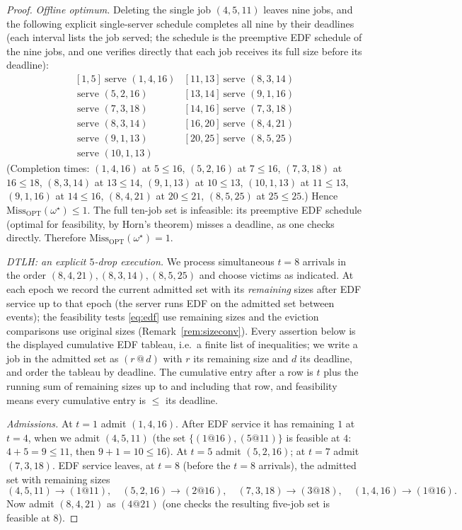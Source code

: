 \documentclass{amsart}
\theoremstyle{definition}
\begin{document}
\begin{proof}
\emph{Offline optimum.} Deleting the single job $(4,5,11)$ leaves nine jobs, and
the following explicit single-server schedule completes all nine by their
deadlines (each interval lists the job served; the schedule is the preemptive EDF
schedule of the nine jobs, and one verifies directly that each job receives its
full size before its deadline):
\[
\begin{array}{ll}
[1,5]\ \text{serve }(1,4,16) & [11,13]\ \text{serve }(8,3,14)\\
[5,7]\ \text{serve }(5,2,16) & [13,14]\ \text{serve }(9,1,16)\\
[7,8]\ \text{serve }(7,3,18) & [14,16]\ \text{serve }(7,3,18)\\
[8,9]\ \text{serve }(8,3,14) & [16,20]\ \text{serve }(8,4,21)\\
[9,10]\ \text{serve }(9,1,13)& [20,25]\ \text{serve }(8,5,25)\\
[10,11]\ \text{serve }(10,1,13)&
\end{array}
\]
(Completion times: $(1,4,16)$ at $5\le16$, $(5,2,16)$ at $7\le16$, $(7,3,18)$ at
$16\le18$, $(8,3,14)$ at $13\le14$, $(9,1,13)$ at $10\le13$, $(10,1,13)$ at
$11\le13$, $(9,1,16)$ at $14\le16$, $(8,4,21)$ at $20\le21$, $(8,5,25)$ at
$25\le25$.) Hence $\mathrm{Miss}_{\mathrm{OPT}}(\omega^\star)\le1$. The full
ten-job set is infeasible: its preemptive EDF schedule (optimal for feasibility,
by Horn's theorem) misses a deadline, as one checks directly. Therefore
$\mathrm{Miss}_{\mathrm{OPT}}(\omega^\star)=1$.

\emph{DTLH: an explicit $5$-drop execution.} We process simultaneous $t=8$
arrivals in the order $(8,4,21),(8,3,14),(8,5,25)$ and choose victims as
indicated. At each epoch we record the current admitted set with its
\emph{remaining} sizes after EDF service up to that epoch (the server runs EDF on
the admitted set between events); the feasibility tests \eqref{eq:edf} use
remaining sizes and the eviction comparisons use original sizes
(Remark~\ref{rem:sizeconv}). Every assertion below is the displayed cumulative
EDF tableau, i.e.\ a finite list of inequalities; we write a job in the admitted
set as $(r\,@\,d)$ with $r$ its remaining size and $d$ its deadline, and order
the tableau by deadline. The cumulative entry after a row is $t$ plus the running
sum of remaining sizes up to and including that row, and feasibility means every
cumulative entry is $\le$ its deadline.

\smallskip
\emph{Admissions.} At $t=1$ admit $(1,4,16)$. After EDF service it has remaining
$1$ at $t=4$, when we admit $(4,5,11)$ (the set $\{(1@16),(5@11)\}$ is feasible
at $4$: $4+5=9\le11$, then $9+1=10\le16$). At $t=5$ admit $(5,2,16)$; at $t=7$
admit $(7,3,18)$. EDF service leaves, at $t=8$ (before the $t=8$ arrivals), the
admitted set with remaining sizes
\[
(4,5,11)\!\to\!(1@11),\quad (5,2,16)\!\to\!(2@16),\quad
(7,3,18)\!\to\!(3@18),\quad (1,4,16)\!\to\!(1@16).
\]
Now admit $(8,4,21)$ as $(4@21)$ (one checks the resulting five-job set is
feasible at $8$).


\end{proof}
\end{document}
